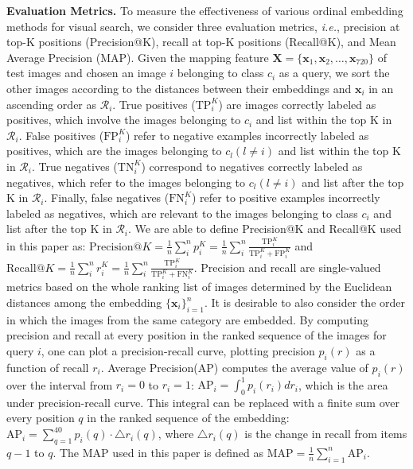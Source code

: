 \documentclass[letterpaper]{article} %
\begin{document}
\textbf{Evaluation Metrics.} To measure the effectiveness of various ordinal embedding methods for visual search, we consider three evaluation metrics, \textit{i.e.}, precision at top-K positions (Precision@K), recall at top-K positions (Recall@K), and Mean Average Precision (MAP). Given the mapping feature $\mathbf{X}=\{\mathbf{x}_1, \mathbf{x}_2,\dots,\mathbf{x}_{720}\}$ of test images and chosen an image $i$ belonging to class $c_i$ as a query, we sort the other images according to the distances between their embeddings and $\mathbf{x}_i$ in an ascending order as $\mathcal{R}_i$. True positives ($\text{TP}^K_i$) are images correctly labeled as positives, which involve the images belonging to $c_i$ and list within the top K in $\mathcal{R}_i$. False positives ($\text{FP}^K_i$) refer to negative examples incorrectly labeled as positives, which are the images belonging to $c_l(l\neq i)$ and list within the top K in $\mathcal{R}_i$. True negatives ($\text{TN}^K_i$) correspond to negatives correctly labeled as negatives, which refer to the images belonging to $c_l(l\neq i)$ and list after the top K in $\mathcal{R}_i$. Finally, false negatives ($\text{FN}^K_i$) refer to positive examples incorrectly labeled as negatives, which are relevant to the images belonging to class $c_i$ and list after the top K in $\mathcal{R}_i$. We are able to define Precision@K and Recall@K used in this paper as:
$
	\text{Precision@}K = \frac{1}{n}\sum_i^{n}p_i^K=\frac{1}{n}\sum_i^{n}\frac{\text{TP}^K_i}{\text{TP}^K_i+\text{FP}^K_i}
$
and
$
	\text{Recall@}K = \frac{1}{n}\sum_i^{n}r_i^K=\frac{1}{n}\sum_i^{n}\frac{\text{TP}^K_i}{\text{TP}^K_i+\text{FN}^K_i}.
$
Precision and recall are single-valued metrics based on the whole ranking list of images determined by the Euclidean distances among the embedding $\{\mathbf{x}_i\}_{i=1}^n$. It is desirable to also consider the order in which the images from the same category are embedded. By computing precision and recall at every position in the ranked sequence of the images for query $i$, one can plot a precision-recall curve, plotting precision $p_i(r)$ as a function of recall $r_i$. Average Precision(AP) computes the average value of $p_i(r)$ over the interval from $r_i=0$ to $r_i=1$: $\text{AP}_i = \int_{0}^1 p_i(r_i)dr_i$, which is the area under precision-recall curve. This integral can be replaced with a finite sum over every position $q$ in the ranked sequence of the embedding: $\text{AP}_i = \sum_{q=1}^{40} p_i(q)\cdot\triangle r_i(q)$, where $\triangle r_i(q)$ is the change in recall from items $q-1$ to $q$. The MAP used in this paper is defined as $\text{MAP} = \frac{1}{n}\sum_{i=1}^{n}\text{AP}_i$.
\end{document}
